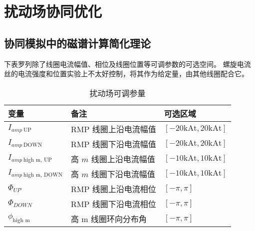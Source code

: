 \chapter{扰动场协同优化}

\section{协同模拟中的磁谱计算简化理论}





  下表罗列除了线圈电流幅值、相位及线圈位置等可调参数的可选空间。
  螺旋电流丝的电流强度和位置实验上不太好控制，将其作为给定量，由其他线圈配合它。

  
\begin{table}[htb]
  \centering
  \caption{扰动场可调参量}
  \label{tab:east_parameter}
  \begin{tabularx}{\linewidth}{lXX}
      \toprule[1.5pt]
      变量 & 备注 & 可选区域 \\
      \midrule[1pt]
      $I_{amp~\text{UP}}$ & RMP 线圈上沿电流幅值 & $[-20 \text{kAt}, 20 \text{kAt}]$\\ 
      $I_{amp~\text{DOWN}}$ & RMP 线圈下沿电流幅值 & $[-20 \text{kAt}, 20 \text{kAt}]$\\ 
      $I_{amp~\text{high m, UP}}$ & 高 $m$ 线圈上沿电流幅值 & $[-10 \text{kAt}, 10 \text{kAt}]$\\
      $I_{amp~\text{high m, DOWN}}$ & 高 $m$ 线圈下沿电流幅值 & $[-10 \text{kAt}, 10 \text{kAt}]$\\
      $\Phi_{UP}$ & RMP 线圈上沿电流相位 & $[-\pi, \pi]$\\
      $\Phi_{DOWN}$ & RMP 线圈下沿电流相位 & $[-\pi, \pi]$\\
      $\phi_{\text{high m}}$ & 高 m 线圈环向分布角 & $[-\pi, \pi]$\\
      \bottomrule[1.5pt]
  \end{tabularx}
\end{table}

